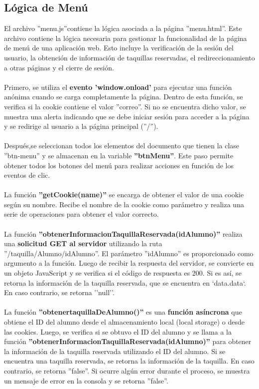 \documentclass[12pt]{report}
\begin{document}
\subsection{Lógica de Menú}
El archivo ''menu.js''contiene la lógica asociada a la página ''menu.html''. Este archivo contiene la lógica necesaria para gestionar la funcionalidad de la página de menú de una aplicación web. Esto incluye la verificación de la sesión del usuario, la obtención de información de taquillas reservadas, el redireccionamiento a otras páginas y el cierre de sesión.\\\\
Primero, se utiliza el \textbf{evento 'window.onload'} para ejecutar una función anónima cuando se carga completamente la página. Dentro de esta función, se verifica si la cookie contiene el valor ''correo''. Si no se encuentra dicho valor, se muestra una alerta indicando que se debe iniciar sesión para acceder a la página y se redirige al usuario a la página principal (''/'').
\\\\
Después,se seleccionan todos los elementos del documento que tienen la clase ''btn-menu'' y se almacenan en la variable \textbf{''btnMenu''}. Este paso permite obtener todos los botones del menú para realizar acciones en función de los eventos de clic.
\\\\
La función \textbf{''getCookie(name)''} se encarga de obtener el valor de una cookie según su nombre. Recibe el nombre de la cookie como parámetro y realiza una serie de operaciones para obtener el valor correcto.
\\\\
La función \textbf{''obtenerInformacionTaquillaReservada(idAlumno)''} realiza una \textbf{solicitud GET al servidor} utilizando la ruta ''/taquilla/Alumno/{idAlumno}''. El parámetro ''idAlumno'' es proporcionado como argumento a la función. Luego de recibir la respuesta del servidor, se convierte en un objeto JavaScript y se verifica si el código de respuesta es 200. Si es así, se retorna la información de la taquilla reservada, que se encuentra en `data.data`. En caso contrario, se retorna ''null''.
\\\\
La función \textbf{''obtenertaquillaDeAlumno()''} es una \textbf{función asíncrona} que obtiene el ID del alumno desde el almacenamiento local (local storage) o desde las cookies. Luego, se verifica si se obtuvo el ID del alumno y se llama a la función \textbf{''obtenerInformacionTaquillaReservada(idAlumno)''} para obtener la información de la taquilla reservada utilizando el ID del alumno. Si se encuentra una taquilla reservada, se retorna la información de la taquilla. En caso contrario, se retorna ''false''. Si ocurre algún error durante el proceso, se muestra un mensaje de error en la consola y se retorna ''false''.
\end{document}
